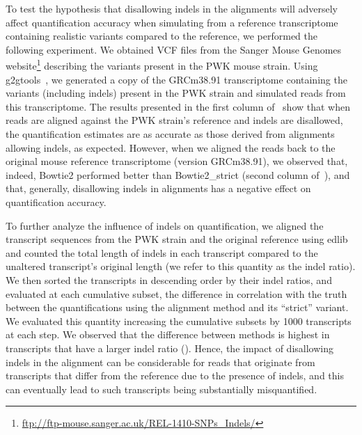 To test the hypothesis that disallowing indels in the alignments will adversely
affect quantification accuracy when simulating from a reference transcriptome
containing realistic variants compared to the reference, we performed the
following experiment. We obtained VCF files from the Sanger Mouse Genomes
website\footnote{\url{ftp://ftp-mouse.sanger.ac.uk/REL-1410-SNPs_Indels/}}
describing the variants present in the PWK mouse strain. Using
g2gtools~\citep{g2gtools}, we generated a copy of the GRCm38.91 transcriptome containing
the variants (including indels) present in the PWK strain and simulated reads
from this transcriptome. The results presented in the first column
of~ show that when reads are aligned against the PWK strain's
reference and indels are disallowed, the quantification estimates are as
accurate as those derived from alignments allowing indels, as expected. However, when we aligned the
reads back to the original mouse reference transcriptome (version GRCm38.91), we
observed that, indeed, Bowtie2 performed better than Bowtie2\_strict (second column
of~), and that, generally, disallowing indels in alignments has
a negative effect on quantification accuracy.

To further analyze the influence of indels on quantification, we aligned the
transcript sequences from the PWK strain and the original reference using
edlib~\citep{vsovsic2017edlib} and counted the total length of indels in each
transcript compared to the unaltered transcript's original length (we refer to
this quantity as the indel ratio). We then sorted the transcripts in descending
order by their indel ratios, and evaluated at each cumulative subset, the
difference in correlation with the truth between the quantifications using the
alignment method and its ``strict'' variant. We evaluated this quantity
increasing the cumulative subsets by 1000 transcripts at each step. We observed
that the difference between methods is highest in transcripts that have a larger
indel ratio (). Hence, the impact of disallowing indels in
the alignment can be considerable for reads that originate from transcripts that
differ from the reference due to the presence of indels, and this can eventually lead
to such transcripts being substantially misquantified.

